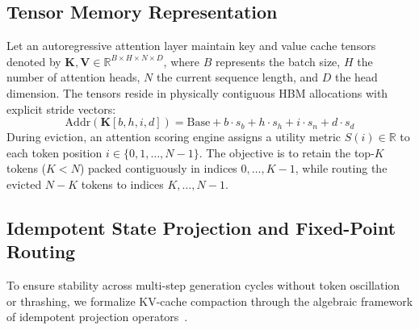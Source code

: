 \documentclass[journal,10pt,twocolumn]{article}
\begin{document}
\subsection{Tensor Memory Representation}
Let an autoregressive attention layer maintain key and value cache tensors denoted by $\mathbf{K}, \mathbf{V} \in \mathbb{R}^{B \times H \times N \times D}$, where $B$ represents the batch size, $H$ the number of attention heads, $N$ the current sequence length, and $D$ the head dimension. The tensors reside in physically contiguous HBM allocations with explicit stride vectors:
\begin{equation}
    \text{Addr}(\mathbf{K}[b, h, i, d]) = \text{Base} + b \cdot s_{b} + h \cdot s_{h} + i \cdot s_{n} + d \cdot s_{d}
\end{equation}
During eviction, an attention scoring engine assigns a utility metric $S(i) \in \mathbb{R}$ to each token position $i \in \{0, 1, \dots, N-1\}$. The objective is to retain the top-$K$ tokens ($K < N$) packed contiguously in indices $0, \dots, K-1$, while routing the evicted $N-K$ tokens to indices $K, \dots, N-1$.

\subsection{Idempotent State Projection and Fixed-Point Routing}
To ensure stability across multi-step generation cycles without token oscillation or thrashing, we formalize KV-cache compaction through the algebraic framework of idempotent projection operators~\cite{cetin2013idempotent}.
\end{document}
